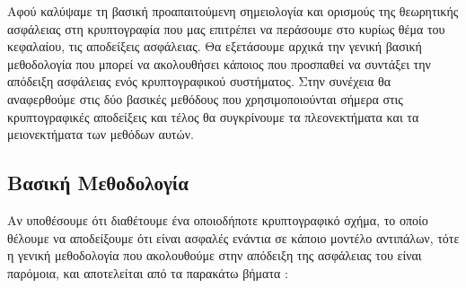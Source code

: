 Αφού καλύψαμε τη βασική προαπαιτούμενη σημειολογία και ορισμούς της θεωρητικής ασφάλειας στη κρυπτογραφία που μας επιτρέπει να περάσουμε στο κυρίως θέμα του κεφαλαίου, τις αποδείξεις ασφάλειας. Θα εξετάσουμε αρχικά την γενική βασική μεθοδολογία που μπορεί να ακολουθήσει κάποιος που προσπαθεί να συντάξει την απόδειξη ασφάλειας ενός κρυπτογραφικού συστήματος. Στην συνέχεια θα αναφερθούμε στις δύο βασικές μεθόδους που χρησιμοποιούνται σήμερα στις κρυπτογραφικές αποδείξεις και τέλος θα συγκρίνουμε τα πλεονεκτήματα και τα μειονεκτήματα των μεθόδων αυτών.

\subsection{Βασική Μεθοδολογία}

Αν υποθέσουμε ότι διαθέτουμε ένα οποιοδήποτε κρυπτογραφικό σχήμα, το οποίο θέλουμε να αποδείξουμε ότι είναι ασφαλές ενάντια σε κάποιο μοντέλο αντιπάλων, τότε η γενική μεθοδολογία που ακολουθούμε στην απόδειξη της ασφάλειας του είναι παρόμοια, και αποτελείται από τα παρακάτω βήματα :
  
